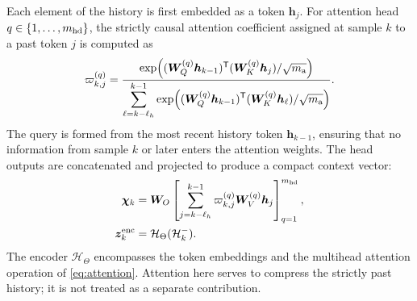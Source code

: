 \documentclass[journal]{IEEEtran}
\newcommand{\T}{\mathsf T}
\newcommand{\1}{\bm 1}
\begin{document}
Each element of the history is first embedded as a token $\bm h_j$. For
attention head $q\in\{1,\ldots,m_{\rm hd}\}$, the strictly causal attention
coefficient assigned at sample $k$ to a past token $j$ is computed as
\begin{equation}
\varpi_{k,j}^{(q)}
=\frac{\exp\!\left(
(\bm W_Q^{(q)}\bm h_{k-1})^\T
(\bm W_K^{(q)}\bm h_j)/\sqrt{m_{\rm a}}\right)}
{\displaystyle\sum_{\ell=k-\ell_h}^{k-1}
\exp\!\left(
(\bm W_Q^{(q)}\bm h_{k-1})^\T
(\bm W_K^{(q)}\bm h_\ell)/\sqrt{m_{\rm a}}\right)}.
\label{eq:attention}
\end{equation}
The query is formed from the most recent history token $\bm h_{k-1}$, ensuring
that no information from sample $k$ or later enters the attention weights. The
head outputs are concatenated and projected to produce a compact context
vector:
\begin{equation}
\begin{aligned}
\bm\chi_k&=\bm W_O
\left[
\sum_{j=k-\ell_h}^{k-1}\varpi_{k,j}^{(q)}
\bm W_V^{(q)}\bm h_j
\right]_{q=1}^{m_{\rm hd}},
\\
\bm z_k^{\rm enc}&=\mathcal H_\Theta(\mathcal H_k^-).
\end{aligned}
\label{eq:encoder}
\end{equation}
The encoder $\mathcal H_\Theta$ encompasses the token embeddings and the
multihead attention operation of \eqref{eq:attention}. Attention here serves
to compress the strictly past history; it is not treated as a separate
contribution.
\end{document}
